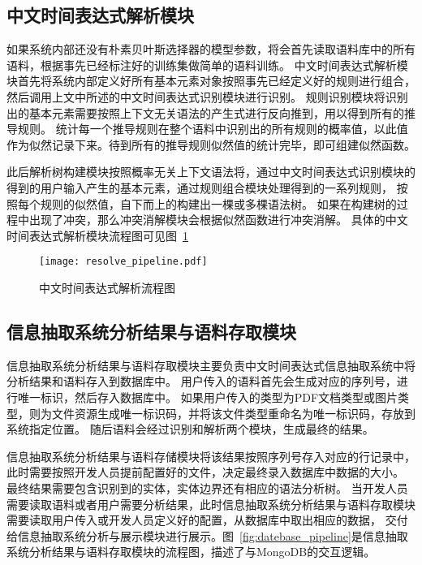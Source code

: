 \subsection{中文时间表达式解析模块}

如果系统内部还没有朴素贝叶斯选择器的模型参数，将会首先读取语料库中的所有语料，根据事先已经标注好的训练集做简单的语料训练。
中文时间表达式解析模块首先将系统内部定义好所有基本元素对象按照事先已经定义好的规则进行组合，然后调用上文中所述的中文时间表达式识别模块进行识别。
规则识别模块将识别出的基本元素需要按照上下文无关语法的产生式进行反向推到，用以得到所有的推导规则。
统计每一个推导规则在整个语料中识别出的所有规则的概率值，以此值作为似然记录下来。待到所有的推导规则似然值的统计完毕，即可组建似然函数。

此后解析树构建模块按照概率无关上下文语法将，通过中文时间表达式识别模块的得到的用户输入产生的基本元素，通过规则组合模块处理得到的一系列规则，
按照每个规则的似然值，自下而上的构建出一棵或多棵语法树。
如果在构建树的过程中出现了冲突，那么冲突消解模块会根据似然函数进行冲突消解。
具体的中文时间表达式解析模块流程图可见图~\ref{fig:resolve_pipeline}

\begin{figure}[h]
  \centering
  \texttt{[image: resolve\_pipeline.pdf]}
  \caption{中文时间表达式解析流程图}
  \label{fig:resolve_pipeline}
\end{figure}

\subsection{信息抽取系统分析结果与语料存取模块}

信息抽取系统分析结果与语料存取模块主要负责中文时间表达式信息抽取系统中将分析结果和语料存入到数据库中。
用户传入的语料首先会生成对应的序列号，进行唯一标识，然后存入数据库中。
如果用户传入的类型为PDF文档类型或图片类型，则为文件资源生成唯一标识码，并将该文件类型重命名为唯一标识码，存放到系统指定位置。
随后语料会经过识别和解析两个模块，生成最终的结果。

信息抽取系统分析结果与语料存储模块将该结果按照序列号存入对应的行记录中，此时需要按照开发人员提前配置好的文件，决定最终录入数据库中数据的大小。
最终结果需要包含识别到的实体，实体边界还有相应的语法分析树。
当开发人员需要读取语料或者用户需要分析结果，此时信息抽取系统分析结果与语料存取模块需要读取用户传入或开发人员定义好的配置，从数据库中取出相应的数据，
交付给信息抽取系统分析与展示模块进行展示。图~\ref{fig:datebase_pipeline}是信息抽取系统分析结果与语料存取模块的流程图，描述了与MongoDB的交互逻辑。

